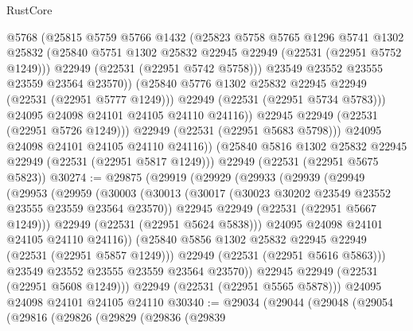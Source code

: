 \begin{lexlean}{RustCore}
\begin{coremodule}
                    @5768
                    (@25815
                      @5759
                      @5766
                      @1432
                      (@25823
                        @5758
                        @5765
                        @1296
                        @5741
                        @1302
                        @25832
                        (@25840 @5751 @1302 @25832 @22945 @22949 (@22531 (@22951 @5752 @1249)))
                        @22949
                        (@22531 (@22951 @5742 @5758)))
                      @23549
                      @23552
                      @23555
                      @23559
                      @23564
                      @23570))
                  (@25840 @5776 @1302 @25832 @22945 @22949 (@22531 (@22951 @5777 @1249)))
                  @22949
                  (@22531 (@22951 @5734 @5783)))
                @24095
                @24098
                @24101
                @24105
                @24110
                @24116))
            @22945
            @22949
            (@22531 (@22951 @5726 @1249)))
          @22949
          (@22531 (@22951 @5683 @5798)))
        @24095
        @24098
        @24101
        @24105
        @24110
        @24116))
    (@25840 @5816 @1302 @25832 @22945 @22949 (@22531 (@22951 @5817 @1249)))
    @22949
    (@22531 (@22951 @5675 @5823))
@30274 := @29875
    (@29919
      (@29929
        (@29933
          (@29939
            (@29949
              (@29953
                (@29959
                  (@30003
                    (@30013
                      (@30017 (@30023 @30202 @23549 @23552 @23555 @23559 @23564 @23570))
                      @22945
                      @22949
                      (@22531 (@22951 @5667 @1249)))
                    @22949
                    (@22531 (@22951 @5624 @5838)))
                  @24095
                  @24098
                  @24101
                  @24105
                  @24110
                  @24116))
              (@25840 @5856 @1302 @25832 @22945 @22949 (@22531 (@22951 @5857 @1249)))
              @22949
              (@22531 (@22951 @5616 @5863)))
            @23549
            @23552
            @23555
            @23559
            @23564
            @23570))
        @22945
        @22949
        (@22531 (@22951 @5608 @1249)))
      @22949
      (@22531 (@22951 @5565 @5878)))
    @24095
    @24098
    @24101
    @24105
    @24110
@30340 := @29034
    (@29044
      (@29048
        (@29054
          (@29816
            (@29826
              (@29829
                (@29836
                  (@29839

\end{coremodule}
\end{lexlean}
